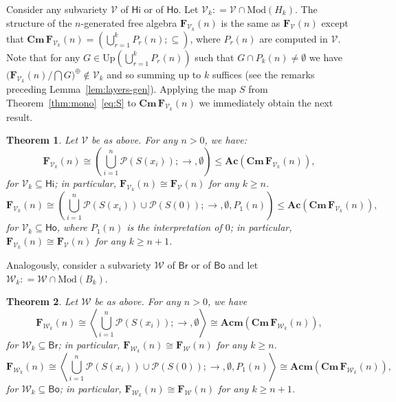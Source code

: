 \documentclass{amsart}
\newtheorem{theorem}{Theorem}[section]
\newcommand{\deq}{\mathrel{\mathop:}=}
\newcommand{\alg}[1]{\mathbf{#1}}
\newcommand{\var}[1]{\mathsf{#1}}
\newcommand{\FV}{\alg{F}_\mathcal{V}}
\newcommand{\Cm}[1]{\mathbf{Cm}\, #1}
\def\ra{\rightarrow}
\def\pw{\mathscr{P}}
\begin{document}
Consider any subvariety $\mathcal{V}$ of $\var{Hi}$
or of $\var{Ho}$. 
Let $\mathcal{V}_k\deq \mathcal{V}\cap \mathrm{Mod}(H_k)$. 
The structure of the $n$-generated free algebra
$\alg{F}_{\mathcal{V}_k}(n)$ is the same as $\FV(n)$ except that
$\Cm{\alg{F}_{\mathcal{V}_k}(n)} =
\left(\bigcup_{r=1}^{k} P_r(n);\subseteq\right)$,
where $P_r(n)$ are computed in $\mathcal{V}$. 
Note that for any 
$G\in \mathrm{Up}\left(\bigcup_{r=1}^{k}P_r(n)\right)$ 
such that $G\cap P_{k}(n)\neq \emptyset$ we have 
$\bigl(\alg{F}_{\mathcal{V}_k}(n)/\bigcap G\bigr)^\oplus\notin\mathcal{V}_k$
and so summing up to $k$ suffices (see the remarks 
preceding Lemma~\ref{lem:layers-gen}).
Applying the map $S$ from Theorem~\ref{thm:mono}~\eqref{eq:S} to
$\Cm{\alg{F}_{\mathcal{V}_k}(n)}$ we immediately obtain the next result. 

\begin{theorem}\label{thm:free-Hik}
Let $\mathcal{V}$ be as above. For any $n > 0$, we have:
$$
\alg{F}_{\mathcal{V}_k}(n)\cong
\left(\bigcup_{i=1}^n\pw(S(x_i));\ra,\emptyset\right)
\leq \alg{Ac}(\Cm{\alg{F}_{\mathcal{V}_k}(n)}),
$$
for $\mathcal{V}_k\subseteq \var{Hi}$;
in particular, $\alg{F}_{\mathcal{V}_k}(n)\cong\FV(n)$
for any $k\geq n$.   
$$
\alg{F}_{\mathcal{V}_k}(n)\cong
\left(\bigcup_{i=1}^{n}\pw(S(x_i))\cup\pw(S(0));\ra,\emptyset, P_1(n)\right)
\leq \alg{Ac}(\Cm{\alg{F}_{\mathcal{V}_k}(n)}),
$$
for $\mathcal{V}_k\subseteq \var{Ho}$, where 
$P_1(n)$ is the interpretation of\/ $0$;
in particular,
$\alg{F}_{\mathcal{V}_k}(n)\cong\FV(n)$ for any $k\geq n+1$.   
\end{theorem}

Analogously, consider a subvariety $\mathcal{W}$ of $\var{Br}$ or of
$\var{Bo}$ and let
$\mathcal{W}_k\deq \mathcal{W}\cap \mathrm{Mod}(B_k)$. 

\begin{theorem}\label{thm:free-Brk}
Let $\mathcal{W}$ be as above. For any $n > 0$, we have
$$
\alg{F}_{\mathcal{W}_k}(n)\cong
\left\langle\bigcup_{i=1}^n\pw(S(x_i));\ra,\emptyset\right\rangle
\cong \alg{Acm}(\Cm{\alg{F}_{\mathcal{W}_k}(n)}),
$$
for $\mathcal{W}_k\subseteq \var{Br}$; in particular,
$\alg{F}_{\mathcal{W}_k}(n)\cong\alg{F}_{\mathcal{W}}(n)$ for any
$k\geq n$.   
$$
\alg{F}_{\mathcal{W}_k}(n)\cong
\left\langle\bigcup_{i=1}^{n}\pw(S(x_i))\cup\pw(S(0));\ra,\emptyset, P_1(n)\right\rangle
\cong \alg{Acm}(\Cm{\alg{F}_{\mathcal{W}_k}(n)}),
$$
for $\mathcal{W}_k\subseteq \var{Bo}$;
in particular, $\alg{F}_{\mathcal{W}_k}(n)\cong\alg{F}_{\mathcal{W}}(n)$ for any
$k\geq n+1$.   
\end{theorem}
\end{document}
